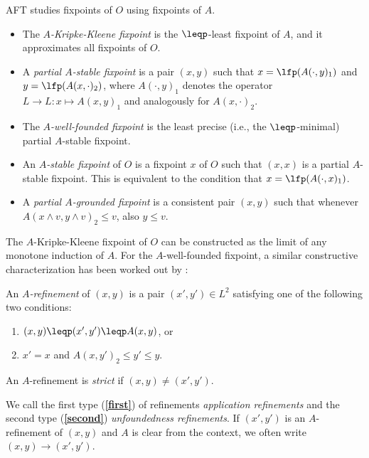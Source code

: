 AFT studies fixpoints of $O$ using fixpoints of $A$. 
 \begin{itemize}
  \item The \emph{$A$-Kripke-Kleene fixpoint} is the $\leqp$-least fixpoint of $A$, and it approximates all fixpoints of $O$. 
\item A \emph{partial $A$-stable fixpoint} is a pair  $(x,y)$ such that $x=\lfp(A(\cdot,y)_1)$ and $y=\lfp(A(x,\cdot)_2)$, where $A(\cdot,y)_1$ denotes the operator $L\to L:x\mapsto A(x,y)_1$ and analogously for $A(x,\cdot)_2$. 
\item The \emph{$A$-well-founded fixpoint} is the least precise (i.e., the $\leqp$-minimal) partial $A$-stable fixpoint.
\item  An \emph{$A$-stable fixpoint} of $O$ is a fixpoint $x$ of $O$ such that $(x,x)$ is a partial $A$-stable fixpoint. This is equivalent to the condition that $x=\lfp(A(\cdot, x)_1)$.
\item A \emph{partial $A$-grounded fixpoint} is a consistent pair $(x,y)$ such that whenever $A(x\land v, y\land v)_2 \leq v$, also $y\leq v$. 
 \end{itemize}

The $A$-Kripke-Kleene fixpoint of $O$ can be constructed as the limit of any monotone induction of $A$. 
For the $A$-well-founded fixpoint, a similar constructive characterization has been worked out by \citet{lpnmr/DeneckerV07}:

\begin{definition}\label{002:def:refinement}
An \emph{$A$-refinement} of $(x,y)$ is a pair $(x',y')\in L^2$ satisfying one of the following two conditions:
\begin{enumerate}
	\item $(x,y)\leqp(x',y')\leqp A(x,y)$, or \label{first}
	\item $x'=x$ and  $A(x,y')_2\leq y'\leq y$. \label{second}
\end{enumerate}
An $A$-refinement is \emph{strict} if $(x,y)\neq (x',y')$.
\end{definition}

We call the first type (\textbf{\ref{first}}) of refinements \emph{application refinements} and the second type (\textbf{\ref{second}}) \emph{unfoundedness refinements}. If $(x',y')$ is an $A$-refinement of $(x,y)$ and $A$ is clear from the context, we often write $(x,y)\to(x',y')$.
%

